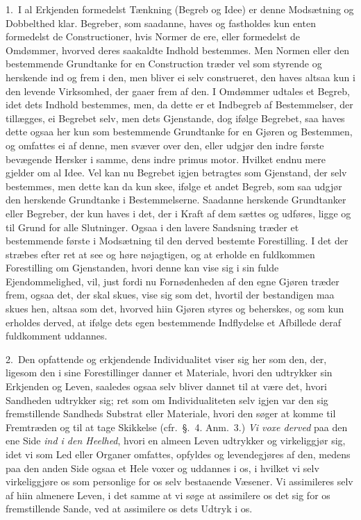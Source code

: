 \documentclass[12pt,a4paper]{book}
\newcommand{\apage}[1]{\marginnote{\footnotesize\textit{[#1]}}}
\begin{document}
1.~I al Erkjenden formedelst Tænkning (Begreb og Idee) er denne Modsætning og
Dobbelthed klar. Begreber, som saadanne, haves og fastholdes kun enten formedelst
de Constructioner, hvis Normer de ere, eller formedelst de Omdømmer, hvorved
deres saakaldte Indhold bestemmes. Men Normen eller den bestemmende Grundtanke
for en Construction træder vel som styrende og herskende ind og frem i den, men
bliver ei selv construeret, den haves altsaa kun i den levende Virksomhed, der
gaaer frem af den. I Omdømmer udtales et Begreb, idet dets Indhold bestemmes,
men, da dette er et  \apage{27} Indbegreb af Bestemmelser, der tillægges, ei Begrebet selv,
men dets Gjenstande, dog ifølge Begrebet, saa haves dette ogsaa her kun som
bestemmende Grundtanke for en Gjøren og Bestemmen, og omfattes ei af denne, men
svæver over den, eller udgjør den indre første bevægende Hersker i samme, dens
indre primus motor. Hvilket endnu mere gjelder om al Idee. Vel kan nu Begrebet
igjen betragtes som Gjenstand, der selv bestemmes, men dette kan da kun skee,
ifølge et andet Begreb, som saa udgjør den herskende Grundtanke i
Bestemmelserne. Saadanne herskende Grundtanker eller Begreber, der kun haves i
det, der i Kraft af dem sættes og udføres, ligge og til Grund for alle
Slutninger. Ogsaa i den lavere Sandsning træder et bestemmende første i
Modsætning til den derved bestemte Forestilling. I det der stræbes efter ret at
see og høre nøjagtigen, og at erholde en fuldkommen Forestilling om Gjenstanden,
hvori denne kan vise sig i sin fulde Ejendommelighed, vil, just fordi nu
Fornødenheden af den egne Gjøren træder frem, ogsaa det, der skal skues, vise
sig som det, hvortil der bestandigen maa skues hen, altsaa som det, hvorved hiin
Gjøren styres og beherskes, og som kun erholdes derved, at ifølge dets egen
bestemmende Indflydelse et Afbillede deraf fuldkomment uddannes.

2.~Den opfattende og erkjendende Individualitet viser sig her som den, der,
ligesom den i sine  \apage{28} Forestillinger danner et Materiale, hvori den udtrykker sin
Erkjenden og Leven, saaledes ogsaa selv bliver dannet til at være det, hvori
Sandheden udtrykker sig; ret som om Individualiteten selv igjen var den sig
fremstillende Sandheds Substrat eller Materiale, hvori den søger at komme til
Fremtræden og til at tage Skikkelse (cfr.\ §.~4. Anm.~3.) \emph{Vi voxe derved}
paa den ene Side \emph{ind i den Heelhed}, hvori en almeen Leven udtrykker og
virkeliggjør sig, idet vi som Led eller Organer omfattes, opfyldes og
levendegjøres af den, medens paa den anden Side ogsaa et Hele voxer og uddannes
i os, i hvilket vi selv virkeliggjøre os som personlige for os selv bestaaende
Væsener. Vi assimileres selv af hiin almenere Leven, i det samme at vi søge at
assimilere os det sig for os fremstillende Sande, ved at assimilere os dets
Udtryk i os.
\end{document}
